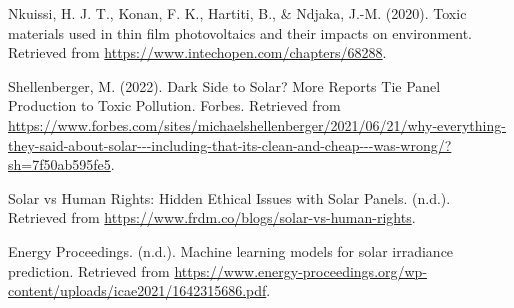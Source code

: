 \documentclass[10pt,twocolumn]{article}
\begin{document}
\begin{thebibliography}{200}
 Nkuissi, H. J. T., Konan, F. K., Hartiti, B., & Ndjaka, J.-M. (2020). Toxic materials used in thin film photovoltaics and their impacts on environment. Retrieved from \url{https://www.intechopen.com/chapters/68288}.

 Shellenberger, M. (2022). Dark Side to Solar? More Reports Tie Panel Production to Toxic Pollution. Forbes. Retrieved from \url{https://www.forbes.com/sites/michaelshellenberger/2021/06/21/why-everything-they-said-about-solar---including-that-its-clean-and-cheap---was-wrong/?sh=7f50ab595fe5}.

 Solar vs Human Rights: Hidden Ethical Issues with Solar Panels. (n.d.). Retrieved from \url{https://www.frdm.co/blogs/solar-vs-human-rights}.

 Energy Proceedings. (n.d.). Machine learning models for solar irradiance prediction. Retrieved from \url{https://www.energy-proceedings.org/wp-content/uploads/icae2021/1642315686.pdf}.

\end{thebibliography}





\printbibliography
\end{document}
